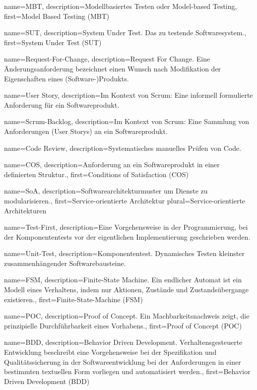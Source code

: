  {
	name={MBT},
	description={Modellbasiertes Testen oder Model-based Testing},
	first={Model Based Testing (MBT)}
}

 {
	name={SUT},
	description={System Under Test. Das zu testende Softwaresystem.},
	first={System Under Test (SUT)}
}

 {
	name={Request-For-Change},
	description={Request For Change. Eine Änderungsanforderung bezeichnet einen  Wunsch nach Modifikation der Eigenschaften eines (Software-)Produkts.}
}

 {
	name={User Story},
	description={Im Kontext von Scrum: Eine informell formulierte Anforderung für ein Softwareprodukt.}
}

 {
	name={Scrum-Backlog},
	description={Im Kontext von Scrum: Eine Sammlung von Anforderungen (User Storys) an ein Softwareprodukt.}
}

 {
	name={Code Review},
	description={Systematisches manuelles Prüfen von Code.}
}

 {
	name={COS},
	description={Anforderung an ein Softwareprodukt in einer definierten Struktur.},
	first={Conditions of Satisfaction (COS)}
}

 {
	name={SoA},
	description={Softwarearchitekturmuster um Dienste zu modularisieren.},
	first={Service-orientierte Architektur}
	plural={Service-orientierte Architekturen}
}

 {
	name={Test-First},
	description={Eine Vorgehensweise in der Programmierung, bei der Komponententests vor der eigentlichen Implementierung geschrieben werden.}
}

 {
	name={Unit-Test},
	description={Komponententest. Dynamisches Testen kleinster zusammenhängender Softwarebausteine.}
}

 {
	name={FSM},
	description={Finite-State Machine. Ein endlicher Automat ist ein Modell eines Verhaltens, indem nur Aktionen, Zustände und Zustandsübergange existieren.},
	first={Finite-State-Machine (FSM)}
}

 {
	name={POC},
	description={Proof of Concept. Ein Machbarkeitsnachweis zeigt, die prinzipielle Durchführbarkeit eines Vorhabens.},
	first={Proof of Concept (POC)}
}

 {
	name={BDD},
	description={Behavior Driven Development. Verhaltensgesteuerte Entwicklung beschreibt eine Vorgehensweise bei der Spezifikation und Qualitätssicherung in der Softwareentwicklung bei der Anforderungen in einer bestimmten textuellen Form vorliegen und automatisiert werden.},
	first={Behavior Driven Development (BDD)}
}

